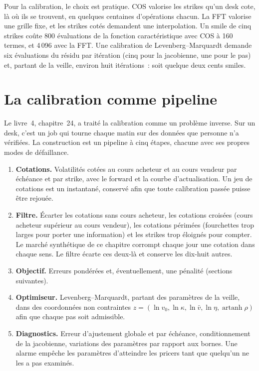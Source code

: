 Pour la calibration, le choix est pratique. COS valorise les strikes qu'un desk cote, là où ils se trouvent, en quelques centaines d'opérations chacun. La FFT
valorise une grille fixe, et les strikes cotés demandent une interpolation. Un smile de cinq strikes coûte 800 évaluations de la fonction caractéristique avec COS à 160 termes, et 4\,096 avec la FFT.
Une calibration de Levenberg--Marquardt demande six évaluations du résidu par itération (cinq pour la jacobienne, une pour le pas) et, partant de
la veille, environ huit itérations~: soit quelque deux cents smiles.

\section{La calibration comme pipeline}

Le livre~4, chapitre~24, a traité la calibration comme un problème inverse. Sur un desk, c'est un job qui tourne chaque matin sur des données que personne n'a vérifiées. La
construction est un pipeline à cinq étapes, chacune avec ses propres modes de défaillance.
\begin{enumerate}
\item \textbf{Cotations.} Volatilités cotées au cours acheteur et au cours vendeur par échéance et par strike, avec le forward et la courbe d'actualisation. Un jeu de cotations est un instantané,
conservé afin que toute calibration passée puisse être rejouée.
\item \textbf{Filtre.} Écarter les cotations sans cours acheteur, les cotations croisées (cours acheteur supérieur au cours vendeur), les cotations périmées (fourchettes trop larges pour porter une information) et
les strikes trop éloignés pour compter. Le marché synthétique de ce chapitre corrompt chaque jour une cotation dans chaque sens. Le filtre écarte ces deux-là et conserve
les dix-huit autres.
\item \textbf{Objectif.} Erreurs pondérées et, éventuellement, une pénalité (sections suivantes).
\item \textbf{Optimiseur.} Levenberg--Marquardt, partant des paramètres de la veille, dans des coordonnées non contraintes
$z=(\ln v_0,\ln\kappa,\ln\bar v,\ln\eta,\operatorname{artanh}\rho)$ afin que chaque pas soit admissible.
\item \textbf{Diagnostics.} Erreur d'ajustement globale et par échéance, conditionnement de la jacobienne, variations des paramètres par rapport aux bornes. Une alarme
empêche les paramètres d'atteindre les pricers tant que quelqu'un ne les a pas examinés.
\end{enumerate}

